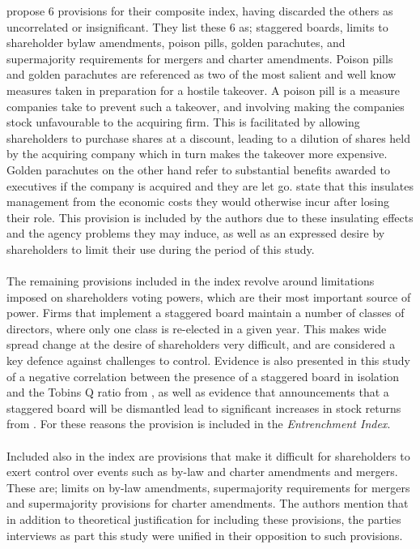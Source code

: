 {{\cite{bebchukWhatMatters} propose 6 provisions for their composite index, having discarded the others as uncorrelated or insignificant. They list these 6 as; staggered boards, limits to shareholder bylaw amendments, poison pills, golden parachutes, and supermajority requirements for mergers and charter amendments. Poison pills and golden parachutes are referenced as two of the most salient and well know measures taken in preparation for a hostile takeover. A poison pill is a measure companies take to prevent such a takeover, and involving making the companies stock unfavourable to the acquiring firm. This is facilitated by allowing shareholders to purchase shares at a discount, leading to a dilution of shares held by the acquiring company which in turn makes the takeover more expensive. Golden parachutes on the other hand refer to substantial benefits awarded to executives if the company is acquired and they are let go. \cite{bebchukWhatMatters} state that this insulates management from the economic costs they would otherwise incur after losing their role. This provision is included by the authors due to these insulating effects and the agency problems they may induce, as well as an expressed desire by shareholders to limit their use during the period of this study. \\\\
The remaining provisions included in the index revolve around limitations imposed on shareholders voting powers, which are their most important source of power. Firms that implement a staggered board maintain a number of classes of directors, where only one class is re-elected in a given year. This makes wide spread change at the desire of shareholders very difficult, and are considered a key defence against challenges to control. Evidence is also presented in this study of a negative correlation between the presence of a staggered board in isolation and the Tobins Q ratio from \cite{bebchukTheCosts}, as well as evidence that announcements that a staggered board will be dismantled lead to significant increases in stock returns from  \cite{guoUndoing}. For these reasons the provision is included in the {\it Entrenchment Index}.\\\\
Included also in the index are provisions that make it difficult for shareholders to exert control over events such as by-law and charter amendments and mergers. These are; limits on by-law amendments, supermajority requirements for mergers and supermajority provisions for charter amendments. The authors mention that in addition to theoretical justification for including these provisions, the parties interviews as part this study were unified in their opposition to such provisions. \\\\
}}
